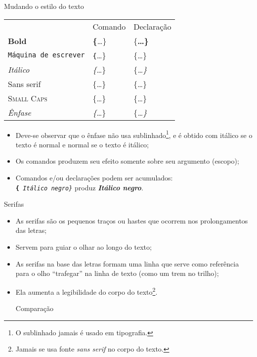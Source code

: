 \begin{frame}{Mudando o estilo do texto}
	\let\tt\ttfamily
		\begin{tabular}{lll}
			& Comando		& Declaração \\
			\textbf{Bold} & \tt\string\textbf\{\dots\}	& \tt\{\string\bfseries \dots\} \\
			\pause
			\texttt{Máquina de escrever} & \tt\string\texttt\{\dots\} & \tt\{\string\ttfamily \dots \}\\
			\pause
			\textit{Itálico} & \tt\string\textit\{\dots\}	& \tt\{\string\itshape\dots\} \\
			\pause
			\textsf{Sans serif} & \tt\string\textsf\{\dots\}& \tt\{\string\sffamily\dots\} \\
			\pause
			\textsc{Small Caps}	& \tt\string\textsc\{\dots\}& \tt\{\string\scshape\dots\} \\
			\pause
			\emph{Ênfase}  & \tt\string\emph\{\dots\} & \tt\{\string\em \dots\}
		\end{tabular}

		\pause
		\begin{itemize}
			\item Deve-se observar que o ênfase não usa sublinhado\footnote{O sublinhado jamais é usado em tipografia.}, e é obtido com itálico se o texto é normal e normal se o texto é itálico;
			\pause
			\item Os comandos produzem seu efeito somente sobre seu argumento (escopo);
			\pause
			\item Comandos e/ou declarações podem ser acumulados: \\ \texttt{\string\textbf\{\string					\itshape\ Itálico negro\}} produz \textbf{\itshape Itálico negro}.
		\end{itemize}
\end{frame}

\begin{frame}{Serifas}
	\begin{itemize}
		\pause
		\item As serifas são os pequenos traços ou hastes que ocorrem nos prolongamentos das letras;
		\pause
		\item Servem para guiar o olhar ao longo do texto;
		\pause
		\item As serifas na base das letras formam uma linha que serve como referência para o olho ``trafegar'' na linha de texto (como um trem no trilho);
		\pause
		\item Ela aumenta a legibilidade do corpo do texto\footnote{Jamais se usa fonte \emph{sans serif} no corpo do texto.}.

		\pause
		\begin{Resultado}{Comparação}
		\end{Resultado}
	\end{itemize}
\end{frame}

